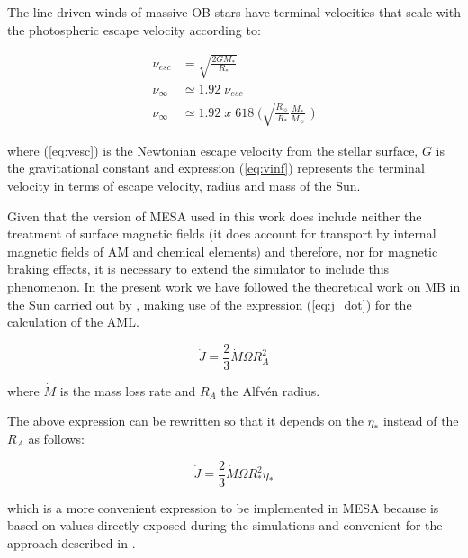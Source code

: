 \documentclass[fleqn,usenatbib]{mnras}
\begin{document}
The line-driven winds of massive OB stars have terminal velocities that scale with the photospheric escape velocity \citep{Lamers2000} according to:
\begin{ceqn}
\begin{align}
\nu_{esc} &= \sqrt{\frac{2GM_*}{R_*}} \label{eq:vesc} \\
\nu_\infty &\simeq 1.92 \;\nu_{esc}\\
\nu_\infty &\simeq 1.92 \; x \; 618 \; \Bigg(\sqrt{\frac{R_{\sun}}{R_*}\frac{M_*}{M_{\sun}}} \;\Bigg) \label{eq:vinf}
\end{align}
\end{ceqn}
where (\ref{eq:vesc}) is the Newtonian escape velocity from the stellar surface, $G$ is the gravitational constant and expression (\ref{eq:vinf}) represents the terminal velocity in terms of escape velocity, radius and mass of the Sun.\par

Given that the version of MESA used in this work does include neither the treatment of surface magnetic fields (it does account for transport by internal magnetic fields of AM and chemical elements) and therefore, nor for magnetic braking effects, it is necessary to extend the simulator to include this phenomenon. In the present work we have followed the theoretical work on MB in the Sun carried out by \citet{Weber1967}, making use of the expression (\ref{eq:j_dot}) for the calculation of the AML.
\begin{ceqn}
\begin{equation}
 \Dot{J} = \frac{2}{3} \Dot{M}\Omega R^{2}_{A} \label{eq:j_dot}
\end{equation}
\end{ceqn}
where $\Dot{M}$ is the mass loss rate and $R_A$ the Alfv\'{e}n radius. \par

The above expression can be rewritten so that it depends on the $\eta_*$ instead of the $R_A$ as follows:
\begin{ceqn}
\begin{equation}
 \Dot{J} = \frac{2}{3} \Dot{M}\Omega R^{2}_{*}\eta_* \label{eq:j_dot_mesa}
\end{equation}
\end{ceqn}
which is a more convenient expression to be implemented in MESA because is based on values directly exposed during the simulations and convenient for the approach described in \citet{Ud-Doula2007}.
\end{document}
